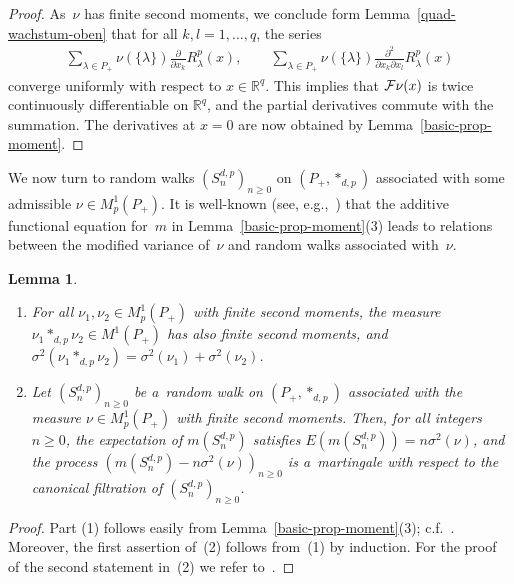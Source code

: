 \documentclass[11pt]{article}
\numberwithin{equation}{section}
\newtheorem{Lemma}[Theorem]{Lemma}
\begin{document}
\begin{proof}
As~$\nu$ has f\/inite second moments, we conclude form Lemma~\ref{quad-wachstum-oben} that for all $k,l=1,\ldots,q$, the
series
\begin{gather*}
\sum\limits_{\lambda\in P_+} \nu( \{\lambda\})
 \frac{\partial}{\partial x_k} R_\lambda^p(x),
\qquad
\sum\limits_{\lambda\in P_+} \nu(\{\lambda\})   \frac{\partial^2}{\partial x_k\partial x_l} R_\lambda^p(x)
\end{gather*}
converge uniformly with respect to $x\in\mathbb R^q$.
This implies that ${\cal F}\nu(x)$ is twice continuously dif\/ferentiable on $\mathbb R^q$, and the partial derivatives
commute with the summation.
The derivatives at $x=0$ are now obtained by Lemma~\ref{basic-prop-moment}.
\end{proof}

We now turn to random walks $(S_n^{d,p})_{n\ge0}$ on $(P_+,*_{d,p})$ associated with some admissible $\nu\in
M^1_p(P_+)$.
It is well-known (see, e.g.,~\cite[Section 7.3]{BH}) that the additive functional equation for~$m$ in
Lemma~\ref{basic-prop-moment}(3) leads to relations between the modif\/ied variance of~$\nu$ and random walks associated
with~$\nu$.

\begin{Lemma}%
\qquad
\begin{enumerate}\itemsep=-1pt
\item[$(1)$]
For all $\nu_1,\nu_2\in M^1_p(P_+)$ with finite second moments, the measure $\nu_1*_{d,p}\nu_2\in
M^1(P_+)$ has also finite second moments, and
$\sigma^2(\nu_1*_{d,p}\nu_2)= \sigma^2(\nu_1)+\sigma^2(\nu_2)$.

\item[$(2)$]
Let $(S_n^{d,p})_{n\ge0}$ be a~random walk on $(P_+,*_{d,p})$ associated with the measure $\nu \in
M^1_p(P_+)$ with finite second moments.
Then, for all integers $n\ge0$, the expectation of $m(S_n^{d,p})$ satisfies $E(m(S_n^{d,p}))=n\sigma^2(\nu)$, and the
process $(m(S_n^{d,p})-n\sigma^2(\nu))_{n\ge0}$
is a~martingale with respect to the canonical filtration of $(S_n^{d,p})_{n\ge0}$.
\end{enumerate}
\end{Lemma}

\begin{proof}
Part (1) follows easily from Lemma~\ref{basic-prop-moment}(3); c.f.~\cite[Section~7.3.7]{BH}.
Moreover, the f\/irst assertion of~(2) follows from~(1) by induction.
For the proof of the second statement in~(2) we refer to~\cite[Proposition 7.3.19]{BH}.
\end{proof}
\end{document}
